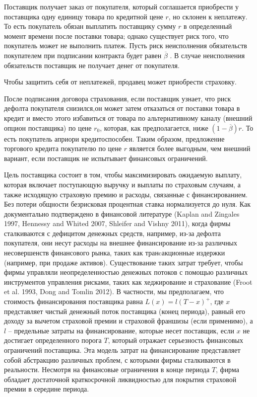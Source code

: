 \documentclass[a4paper,12pt]{article}
\begin{document}
Поставщик получает заказ от покупателя, который соглашается приобрести у поставщика одну единицу товара по кредитной цене $r$, но склонен к неплатежу.
То есть покупатель обязан выплатить поставщику сумму $r$ в определенный момент времени после поставки товара; однако существует риск того, что покупатель может не выполнить платеж.
Пусть риск неисполнения обязательств покупателем при подписании контракта будет равен $\overline{\beta}$ . В случае неисполнения обязательств поставщик не получает денег от покупателя.

Чтобы защитить себя от неплатежей, продавец может приобрести страховку.

После подписания договора страхования, если поставщик узнает, что риск дефолта покупателя снизился,он может затем отказаться от поставки товара в кредит и вместо этого избавиться от товара по альтернативному каналу (внешний опцион поставщика) по цене $r_{0}$,
которая, как предполагается, ниже $(1 - \overline{\beta})r$. То есть покупатель априори кредитоспособен. Таким образом, предложение торгового кредита покупателю по
цене $r$ является более выгодным, чем внешний вариант, если поставщик не испытывает финансовых ограничений.

Цель поставщика состоит в том, чтобы максимизировать ожидаемую выплату, которая включает поступающую выручку и выплаты по страховым случаям, а также исходящую страховую премию и расходы, связанные с финансированием. Без потери общности безрисковая процентная ставка нормализуется до нуля.  Как документально подтверждено в финансовой литературе (Kaplan and Zingales 1997, Hennessy and Whited 2007, Shleifer and Vishny 2011), когда фирмы сталкиваются с дефицитом денежных средств, например, из-за дефолта покупателя, они несут расходы на внешнее финансирование из-за различных несовершенств финансового рынка, таких как транcакционные издержки (например, при продаже активов). Существование таких затрат требует, чтобы фирмы управляли неопределенностью денежных потоков с помощью различных инструментов управления рисками, таких как хеджирование и страхование (Froot et al. 1993, Dong and Tomlin 2012). В частности, мы предполагаем, что стоимость финансирования поставщика равна $L(x) = l(T - x)^{+}$, где $x$ представляет чистый денежный поток поставщика (конец периода), равный его доходу за вычетом страховой премии и страховой франшизы (если применимо), а $l$ -- предельные затраты на финансирование, которые несет поставщик, если $x$ не достигает определенного порога $T$, который отражает серьезность финансовых ограничений поставщика. Эта модель затрат на финансирование представляет собой абстракцию различных проблем, с которыми фирмы сталкиваются в реальности. Несмотря на финансовые ограничения в конце периода $T$, фирма обладает достаточной краткосрочной ликвидностью для покрытия страховой премии в середине периода.
\end{document}
